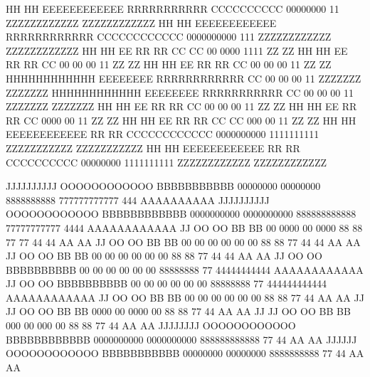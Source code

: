 \documentclass[
11pt,
a4paper,
oneside
]{scrbook}
\begin{document}
\vspace{2ex}
\begin{Printout}[
	form=ibm1403,
	paperheight=60,
	bandlines=3,
	feedlines=3,
	fitcolumns=132,
	linenumbers=true,
	punchholes=true,
	fontsize=\scriptsize
	]
HH        HH  EEEEEEEEEEEE  RRRRRRRRRRR    CCCCCCCCCC     00000000         11       ZZZZZZZZZZZZ  ZZZZZZZZZZZZ
HH        HH  EEEEEEEEEEEE  RRRRRRRRRRRR  CCCCCCCCCCCC   0000000000       111       ZZZZZZZZZZZZ  ZZZZZZZZZZZZ 
HH        HH  EE            RR        RR  CC        CC  00      0000     1111                ZZ            ZZ   
HH        HH  EE            RR        RR  CC            00     00 00       11               ZZ            ZZ     
HH        HH  EE            RR        RR  CC            00    00  00       11              ZZ            ZZ       
HHHHHHHHHHHH  EEEEEEEE      RRRRRRRRRRRR  CC            00   00   00       11          ZZZZZZZ       ZZZZZZZ       
HHHHHHHHHHHH  EEEEEEEE      RRRRRRRRRRR   CC            00  00    00       11          ZZZZZZZ       ZZZZZZZ        
HH        HH  EE            RR    RR      CC            00 00     00       11           ZZ            ZZ             
HH        HH  EE            RR     RR     CC            0000      00       11          ZZ            ZZ               
HH        HH  EE            RR      RR    CC        CC  000       00       11         ZZ            ZZ                 
HH        HH  EEEEEEEEEEEE  RR       RR   CCCCCCCCCCCC   0000000000    1111111111    ZZZZZZZZZZZ   ZZZZZZZZZZZ          
HH        HH  EEEEEEEEEEEE  RR        RR   CCCCCCCCCC     00000000     1111111111   ZZZZZZZZZZZZ  ZZZZZZZZZZZZ           



  JJJJJJJJJJ  OOOOOOOOOOOO  BBBBBBBBBBB     00000000      00000000     8888888888   777777777777        444             AAAAAAAAAA 
  JJJJJJJJJJ  OOOOOOOOOOOO  BBBBBBBBBBBB   0000000000    0000000000   888888888888  77777777777        4444            AAAAAAAAAAAA
      JJ      OO        OO  BB        BB  00      0000  00      0000  88        88  77      77        44 44            AA        AA
      JJ      OO        OO  BB        BB  00     00 00  00     00 00  88        88         77        44  44            AA        AA
      JJ      OO        OO  BB       BB   00    00  00  00    00  00   88      88         77        44   44            AA        AA
      JJ      OO        OO  BBBBBBBBBB    00   00   00  00   00   00    88888888         77        44444444444         AAAAAAAAAAAA
      JJ      OO        OO  BBBBBBBBBB    00  00    00  00  00    00    88888888         77       444444444444         AAAAAAAAAAAA
      JJ      OO        OO  BB       BB   00 00     00  00 00     00   88      88        77              44            AA        AA
JJ    JJ      OO        OO  BB        BB  0000      00  0000      00  88        88       77              44            AA        AA
JJ    JJ      OO        OO  BB        BB  000       00  000       00  88        88       77              44            AA        AA
JJJJJJJJ      OOOOOOOOOOOO  BBBBBBBBBBBB   0000000000    0000000000   888888888888       77              44            AA        AA
 JJJJJJ       OOOOOOOOOOOO  BBBBBBBBBBB     00000000      00000000     8888888888        77              44            AA        AA



\end{Printout}
\end{document}
